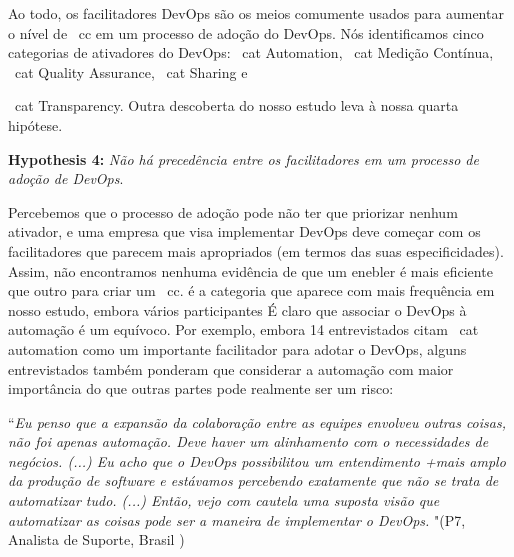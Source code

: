 Ao todo, os facilitadores DevOps são os meios comumente usados para aumentar o nível de
\ cc em um processo de adoção do DevOps.
Nós identificamos cinco categorias de ativadores do DevOps:
\ cat {Automation}, \ cat {Medição Contínua}, \ cat {Quality Assurance},
\ cat {Sharing} e {\ cat {Transparency}. Outra descoberta do nosso
estudo leva à nossa quarta hipótese.

\begin{mh}
\textbf{Hypothesis 4:} \textit{Não há precedência entre os facilitadores em um processo de adoção de DevOps}.
\end{mh}

Percebemos que o processo de adoção pode não ter que priorizar nenhum ativador, e uma empresa que visa implementar
DevOps deve começar com os facilitadores que parecem mais apropriados (em termos
das suas especificidades). Assim, não encontramos nenhuma evidência de que um enebler
é mais eficiente que outro para criar um \ cc.  é a categoria
que aparece com mais frequência em nosso estudo, embora vários participantes
É claro que associar o DevOps à automação é um equívoco.
Por exemplo, embora 14 entrevistados citam \ cat {automation} como um importante
 facilitador para adotar o DevOps, alguns entrevistados também ponderam que considerar
 a automação com maior importância do que outras partes pode realmente ser um risco:

\begin{mq}
``\emph{Eu penso que a expansão da colaboração entre as equipes envolveu outras
coisas, não foi apenas automação. Deve haver um alinhamento com o
necessidades de negócios. (...) Eu acho que o DevOps possibilitou um entendimento
+mais amplo da produção de software e estávamos percebendo exatamente que não se
trata de automatizar tudo. (...) Então, vejo com cautela uma suposta visão que
automatizar as coisas pode ser a maneira de implementar o DevOps.} "(P7, Analista
de Suporte, Brasil
)
\end{mq}



}
